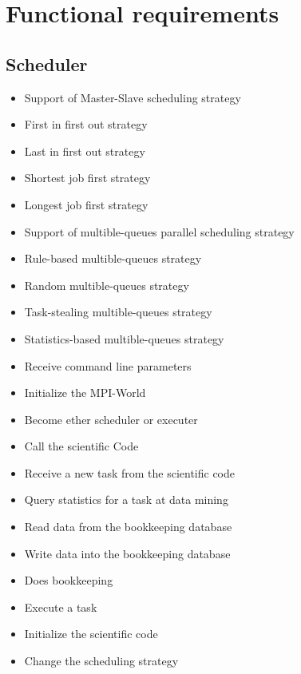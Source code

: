 {


\setcounter{func}{10}
\renewcommand{\labelitemi}{
	\ifnum \value{func}<10$/F 0\arabic{func} /$\addtocounter{func}{10}
	\else $/F \arabic{func} /$\addtocounter{func}{10}\fi
	}

\section{Functional requirements} 
	
	\subsection{Scheduler}
	
		\begin{itemize}
			\item Support of Master-Slave scheduling strategy
			\item First in first out strategy
			\item Last in first out strategy
			\item Shortest job first strategy
			\item Longest job first strategy 
			\item Support of multible-queues parallel scheduling strategy
			\item Rule-based multible-queues strategy
			\item Random multible-queues strategy
			\item Task-stealing multible-queues strategy
			\item Statistics-based multible-queues strategy
			\item Receive command line parameters
			\item Initialize the MPI-World
			\item Become ether scheduler or executer
			\item Call the scientific Code 
			\item Receive a new task from the scientific code
			\item Query statistics for a task at data mining
			\item Read data from the bookkeeping database
			\item Write data into the bookkeeping database
			\item Does bookkeeping
			\item Execute a task
			\item Initialize the scientific code
			\item Change the scheduling strategy
		\end{itemize}
	
}
